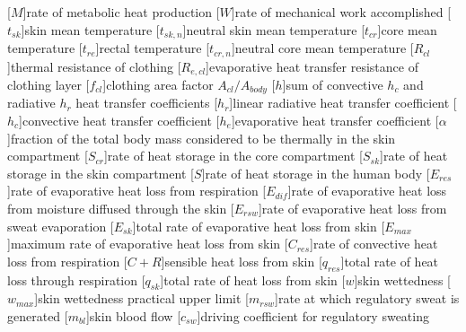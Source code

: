 \documentclass[a4paper, 10pt]{letter}
\begin{document}
    [$M$]{rate of metabolic heat production}
    [$W$]{rate of mechanical work accomplished}
    [$t_{sk}$]{skin mean temperature}
    [$t_{sk,n}$]{neutral skin mean temperature}
    [$t_{cr}$]{core mean temperature}
    [$t_{re}$]{rectal temperature}
    [$t_{cr,n}$]{neutral core mean temperature}
    [$R_{cl}$]{thermal resistance of clothing}
    [$R_{e,cl}$]{evaporative heat transfer resistance of clothing layer}
    [$f_{cl}$]{clothing area factor $A_{cl}/A_{body}$}
    [$h$]{sum of convective $h_{c}$ and radiative $h_{r}$ heat transfer coefficients}
    [$h_{r}$]{linear radiative heat transfer coefficient}
    [$h_{c}$]{convective heat transfer coefficient}
    [$h_{e}$]{evaporative heat transfer coefficient}
    [$\alpha$]{fraction of the total body mass considered
    to be thermally in the skin compartment}
    [$S_{cr}$]{rate of heat storage in the core compartment}
    [$S_{sk}$]{rate of heat storage in the skin compartment}
    [$S$]{rate of heat storage in the human body}
    [$E_{res}$]{rate of evaporative heat loss from respiration}
    [$E_{dif}$]{rate of evaporative heat loss from moisture diffused through the skin}
    [$E_{rsw}$]{rate of evaporative heat loss from sweat evaporation}
    [$E_{sk}$]{total rate of evaporative heat loss from skin}
    [$E_{max}$]{maximum rate of evaporative heat loss from skin}
    [$C_{res}$]{rate of convective heat loss from respiration}
    [$C + R$]{sensible heat loss from skin}
    [$q_{res}$]{total rate of heat loss through respiration}
    [$q_{sk}$]{total rate of heat loss from skin}
    [$w$]{skin wettedness}
    [$w_{max}$]{skin wettedness practical upper limit}
    [$m_{rsw}$]{rate at which regulatory sweat is generated}
    [$m_{bl}$]{skin blood flow}
    [$c_{sw}$]{driving coefficient for regulatory sweating}
\end{document}
